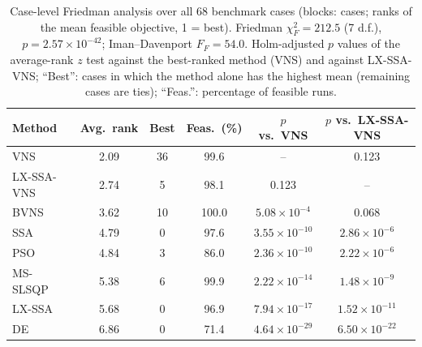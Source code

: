 \begin{table}[!t]
\centering
\caption{Case-level Friedman analysis over all 68 benchmark cases (blocks: cases; ranks of the mean feasible objective, 1 = best). Friedman $\chi^2_F=212.5$ (7 d.f.), $p=2.57\times10^{-42}$; Iman--Davenport $F_F=54.0$. Holm-adjusted $p$ values of the average-rank $z$ test against the best-ranked method (VNS) and against LX-SSA-VNS; ``Best'': cases in which the method alone has the highest mean (remaining cases are ties); ``Feas.'': percentage of feasible runs.}
\label{tab:friedman68}
\scriptsize\setlength{\tabcolsep}{3pt}
\begin{tabular}{lccccc}
\toprule
Method & Avg.\ rank & Best & Feas.\ (\%) & $p$ vs.\ VNS & $p$ vs.\ LX-SSA-VNS \\
\midrule
VNS & 2.09 & 36 & 99.6 & -- & 0.123 \\
LX-SSA-VNS & 2.74 & 5 & 98.1 & 0.123 & -- \\
BVNS & 3.62 & 10 & 100.0 & $5.08\times10^{-4}$ & 0.068 \\
SSA & 4.79 & 0 & 97.6 & $3.55\times10^{-10}$ & $2.86\times10^{-6}$ \\
PSO & 4.84 & 3 & 86.0 & $2.36\times10^{-10}$ & $2.22\times10^{-6}$ \\
MS-SLSQP & 5.38 & 6 & 99.9 & $2.22\times10^{-14}$ & $1.48\times10^{-9}$ \\
LX-SSA & 5.68 & 0 & 96.9 & $7.94\times10^{-17}$ & $1.52\times10^{-11}$ \\
DE & 6.86 & 0 & 71.4 & $4.64\times10^{-29}$ & $6.50\times10^{-22}$ \\
\bottomrule
\end{tabular}
\end{table}

